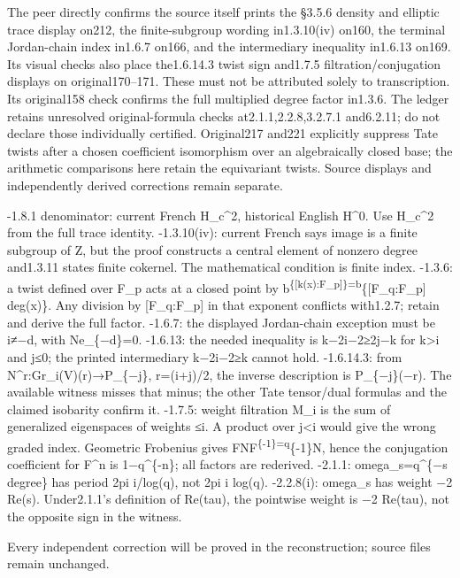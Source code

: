 \documentclass[
]{report}
\begin{document}
The peer directly confirms the source itself prints the §3.5.6 density
and elliptic trace display on212, the finite-subgroup wording
in1.3.10(iv) on160, the terminal Jordan-chain index in1.6.7 on166, and
the intermediary inequality in1.6.13 on169. Its visual checks also place
the1.6.14.3 twist sign and1.7.5 filtration/conjugation displays on
original170--171. These must not be attributed solely to transcription.
Its original158 check confirms the full multiplied degree factor
in1.3.6. The ledger retains unresolved original-formula checks
at2.1.1,2.2.8,3.2.7.1 and6.2.11; do not declare those individually
certified. Original217 and221 explicitly suppress Tate twists after a
chosen coefficient isomorphism over an algebraically closed base; the
arithmetic comparisons here retain the equivariant twists. Source
displays and independently derived corrections remain separate.

-1.8.1 denominator: current French H\_c\^{}2, historical English H\^{}0.
Use H\_c\^{}2 from the full trace identity. -1.3.10(iv): current French
says image is a finite subgroup of Z, but the proof constructs a central
element of nonzero degree and1.3.11 states finite cokernel. The
mathematical condition is finite index. -1.3.6: a twist defined over
F\_p acts at a closed point by
b\textsuperscript{\{{[}k(x):F\_p{]}\}=b}\{{[}F\_q:F\_p{]} deg(x)\}. Any
division by {[}F\_q:F\_p{]} in that exponent conflicts with1.2.7; retain
and derive the full factor. -1.6.7: the displayed Jordan-chain exception
must be i≠−d, with Ne\_\{−d\}=0. -1.6.13: the needed inequality is
k−2i−2≥2j−k for k\textgreater i and j≤0; the printed intermediary
k−2i−2≥k cannot hold. -1.6.14.3: from N\^{}r:Gr\_i(V)(r)→P\_\{−j\},
r=(i+j)/2, the inverse description is P\_\{−j\}(−r). The available
witness misses that minus; the other Tate tensor/dual formulas and the
claimed isobarity confirm it. -1.7.5: weight filtration M\_i is the sum
of generalized eigenspaces of weights ≤i. A product over j\textless i
would give the wrong graded index. Geometric Frobenius gives
FNF\textsuperscript{\{-1\}=q}\{-1\}N, hence the conjugation coefficient
for F\^{}n is 1−q\^{}\{-n\}; all factors are rederived. -2.1.1:
omega\_s=q\^{}\{−s degree\} has period 2pi i/log(q), not 2pi i log(q).
-2.2.8(i): omega\_s has weight −2 Re(s). Under2.1.1's definition of
Re(tau), the pointwise weight is −2 Re(tau), not the opposite sign in
the witness.

Every independent correction will be proved in the reconstruction;
source files remain unchanged.
\end{document}
